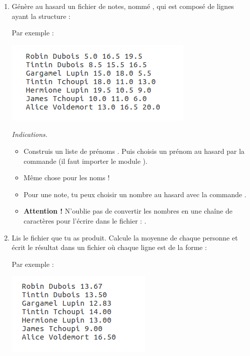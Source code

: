 \documentclass[11pt,class=report,crop=false]{standalone}
\begin{document}
\begin{activite}


\begin{enumerate}
  \item Génère au hasard un fichier de notes, nommé , qui est composé de lignes ayant la structure : 
  
  Par exemple :
\begin{center}
\includegraphics[scale=\myscale,scale=0.7]{ecran-fichiers-1a}
\end{center} 

  \emph{Indications.}
  \begin{itemize}
    	\item Construis un liste de prénoms . Puis choisis un prénom au hasard par la commande
    	 (il faut importer le module ).
    	
    	\item Même chose pour les noms ! 
    	
    	\item Pour une note, tu peux choisir un nombre au hasard avec la commande  . 
    	
    	\item \textbf{Attention !} N'oublie pas de convertir les nombres en une chaîne de caractères pour l'écrire dans le fichier : .
    	
   \end{itemize}
    
  
  \item Lis le fichier  que tu as produit. Calcule la moyenne de chaque personne et écrit le résultat dans un fichier  où chaque ligne est de la forme : 
  
    Par exemple :
\begin{center}
\includegraphics[scale=\myscale,scale=0.7]{ecran-fichiers-1b}
\end{center}  


\end{enumerate}
\end{activite}
\end{document}

